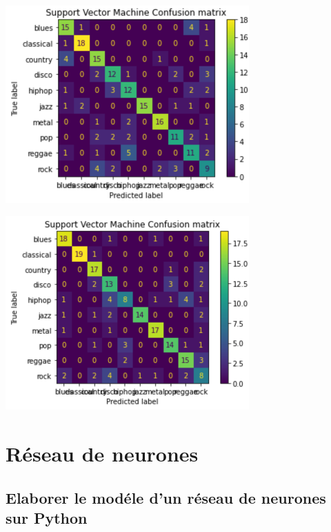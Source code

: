 \documentclass[10pt]{article}
\begin{document}
\begin{minipage}[t]{0.5\linewidth}

\includegraphics[width=0.7\textwidth]{SVM-ConfusionMatrix.png}

\end{minipage}
\begin{minipage}[t]{0.5\linewidth}

\includegraphics[width=0.7\textwidth]{SVM-ConfusionMatrix2.png}

\end{minipage}
\vspace{0.2cm}


\section{Réseau de neurones}


\subsection{Elaborer le modéle d'un réseau de neurones sur Python}
\end{document}
